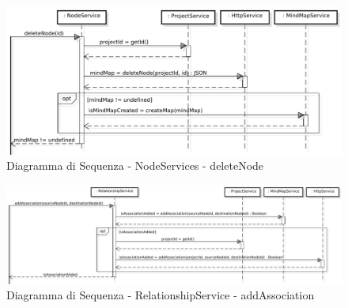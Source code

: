 \FloatBarrier
{}
\begin{center}
\begin{figure}[h]
\centering
\includegraphics[scale=0.33,keepaspectratio]{diagrammi/sequenza/FrontEnd/services/deleteNode.pdf}
\caption{Diagramma di Sequenza - NodeServices - deleteNode}
\end{figure}
\end{center}
\FloatBarrier
{}
\begin{center}
\begin{figure}[h]
\centering
\includegraphics[scale=0.27,keepaspectratio]{diagrammi/sequenza/FrontEnd/services/addAssociation.pdf}
\caption{Diagramma di Sequenza - RelationshipService - addAssociation}
\end{figure}
\end{center}
